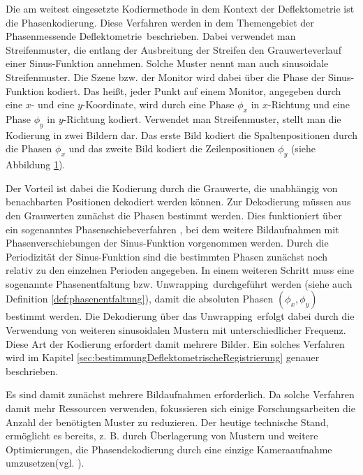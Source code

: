 Die am weitest eingesetzte Kodiermethode in dem Kontext der Deflektometrie ist die Phasenkodierung.
Diese Verfahren werden in dem Themengebiet der \glqq Phasenmessende Deflektometrie\grqq ~beschrieben.
Dabei verwendet man Streifenmuster, die entlang der Ausbreitung der Streifen den Grauwerteverlauf einer Sinus-Funktion annehmen.
Solche Muster nennt man auch sinusoidale Streifenmuster.
Die Szene bzw. der Monitor wird dabei über die Phase der Sinus-Funktion kodiert.
Das heißt, jeder Punkt auf einem Monitor, angegeben durch eine $x$- und eine $y$-Koordinate, wird durch eine Phase $\phi_x$ in $x$-Richtung und eine Phase $\phi_y$ in $y$-Richtung kodiert.
Verwendet man Streifenmuster, stellt man die Kodierung in zwei Bildern dar.
Das erste Bild kodiert die Spaltenpositionen durch die Phasen $\phi_x$ und das zweite Bild kodiert die Zeilenpositionen $\phi_y$ (siehe Abbildung \ref{tikz:abbSinusoidaleStreifenmuster}).

\begin{figure}[H]
	\centering
		
		\label{tikz:abbSinusoidaleStreifenmuster}
\end{figure}

\noindent
Der Vorteil ist dabei die Kodierung durch die Grauwerte, die unabhängig von benachbarten Positionen dekodiert werden können.
Zur Dekodierung müssen aus den Grauwerten zunächst die Phasen bestimmt werden.
Dies funktioniert über ein sogenanntes Phasenschiebeverfahren \cite{carre}, bei dem weitere Bildaufnahmen mit Phasenverschiebungen der Sinus-Funktion vorgenommen werden.
Durch die Periodizität der Sinus-Funktion sind die bestimmten Phasen zunächst noch relativ zu den einzelnen Perioden angegeben.
In einem weiteren Schritt muss eine sogenannte Phasenentfaltung bzw. \glqq Unwrapping\grqq ~durchgeführt werden (siehe auch Definition \ref{def:phasenentfaltung}), damit die absoluten Phasen $\left(\phi_x,\phi_y\right)$ bestimmt werden.
Die Dekodierung über das \glqq Unwrapping\grqq ~erfolgt dabei durch die Verwendung von weiteren sinusoidalen Mustern mit unterschiedlicher Frequenz.
Diese Art der Kodierung erfordert damit mehrere Bilder.
Ein solches Verfahren wird im Kapitel \ref{sec:bestimmungDeflektometrischeRegistrierung} genauer beschrieben.

\p
Es sind damit zunächst mehrere Bildaufnahmen erforderlich.
Da solche Verfahren damit mehr Ressourcen verwenden, fokussieren sich einige Forschungsarbeiten die Anzahl der benötigten Muster zu reduzieren.
Der heutige technische Stand, ermöglicht es bereits, z. B. durch Überlagerung von Mustern und weitere Optimierungen, die Phasendekodierung durch eine einzige Kameraaufnahme umzusetzen(vgl. \cite{waveletPMD}).